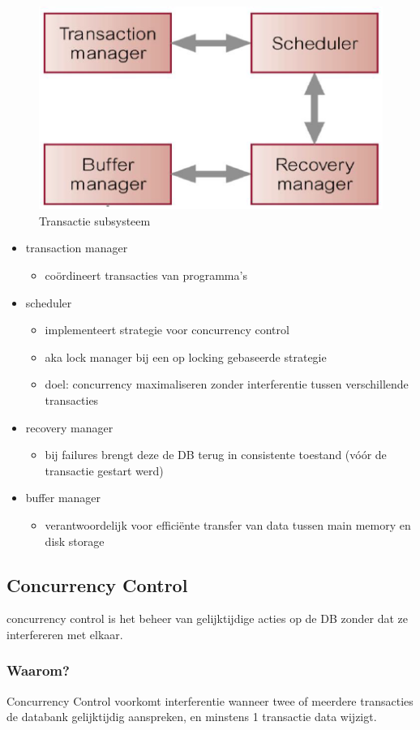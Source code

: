 \documentclass[a4paper,12pt]{article}
\begin{document}
\begin{figure}[H]
\centering
  	\includegraphics[width=.35\linewidth]{img/transactionSubsysteem.png}
  	\caption{Transactie subsysteem}
  	\label{fig:TransactieSubsysteem}
\end{figure}

\begin{itemize}
\item transaction manager
	\begin{itemize}
	\item coördineert transacties van programma's
	\end{itemize}
\item scheduler
	\begin{itemize}
	\item implementeert strategie voor concurrency control
	\item aka lock manager bij een op locking gebaseerde strategie
	\item doel: concurrency maximaliseren zonder interferentie tussen verschillende transacties
	\end{itemize}
\item recovery manager
	\begin{itemize}
	\item bij failures brengt deze de DB terug in consistente toestand (vóór de transactie gestart werd)	
	\end{itemize}
\item buffer manager
	\begin{itemize}
	\item verantwoordelijk voor efficiënte transfer van data tussen main memory en disk storage
	\end{itemize}
\end{itemize}

\subsection{Concurrency Control}
concurrency control is het beheer van gelijktijdige acties op de DB zonder dat ze interfereren met elkaar.

\subsubsection{Waarom?}
Concurrency Control voorkomt interferentie wanneer twee of meerdere transacties de databank gelijktijdig aanspreken, en minstens 1 transactie data wijzigt.
\end{document}
